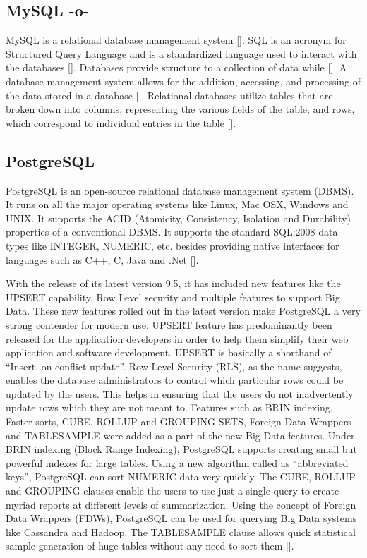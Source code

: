      
\subsection{MySQL -o-}

MySQL is a relational database management system [\cite{devmysql}]. SQL
is an acronym for Structured Query Language and is a standardized
language used to interact with the databases [\cite{devmysql}].
Databases provide structure to a collection of data
while [\cite{devmysql}]. A database management system allows for the
addition, accessing, and processing of the data stored in a
database [\cite{devmysql}]. Relational databases utilize tables that are
broken down into columns, representing the various fields of the
table, and rows, which correspond to individual entries in the
table [\cite{howmysql}].


     
\subsection{PostgreSQL}

PostgreSQL is an open-source relational database management system
(DBMS).  It runs on all the major operating systems like Linux, Mac
OSX, Windows and UNIX.  It supports the ACID (Atomicity, Consistency,
Isolation and Durability) properties of a conventional DBMS.  It
supports the standard SQL:2008 data types like INTEGER, NUMERIC,
etc. besides providing native interfaces for languages such as C++, C,
Java and .Net [\cite{www-postgreSQL-about}].

With the release of its latest version 9.5, it has included new
features like the UPSERT capability, Row Level security and multiple
features to support Big Data.  These new features rolled out in the
latest version make PostgreSQL a very strong contender for modern use.
UPSERT feature has predominantly been released for the application
developers in order to help them simplify their web application and
software development.  UPSERT is basically a shorthand of ``Insert, on
conflict update''.  Row Level Security (RLS), as the name suggests,
enables the database administrators to control which particular rows
could be updated by the users.  This helps in ensuring that the users
do not inadvertently update rows which they are not meant to.
Features such as BRIN indexing, Faster sorts, CUBE, ROLLUP and
GROUPING SETS, Foreign Data Wrappers and TABLESAMPLE were added as a
part of the new Big Data features.  Under BRIN indexing (Block Range
Indexing), PostgreSQL supports creating small but powerful indexes for
large tables.  Using a new algorithm called as ``abbreviated keys'',
PostgreSQL can sort NUMERIC data very quickly.  The CUBE, ROLLUP and
GROUPING clauses enable the users to use just a single query to create
myriad reports at different levels of summarization.  Using the
concept of Foreign Data Wrappers (FDWs), PostgreSQL can be used for
querying Big Data systems like Cassandra and Hadoop.  The TABLESAMPLE
clause allows quick statistical sample generation of huge tables
without any need to sort them [\cite{www-postgreSQL-features}].

